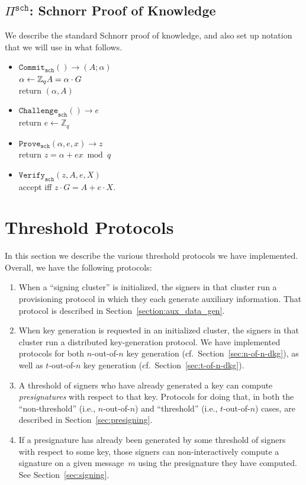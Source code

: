 \documentclass[11pt]{article}
\newcommand{\proof}[1]{\ensuremath{\Pi^{\mathtt{#1}}}}
\newcommand{\commit}[1]{\ensuremath{\mathtt{Commit}_{\mathtt{#1}}}}
\newcommand{\challenge}[1]{\ensuremath{\mathtt{Challenge}_{\mathtt{#1}}}}
\newcommand{\prove}[1]{\ensuremath{\mathtt{Prove}_{\mathtt{#1}}}}
\newcommand{\verify}[1]{\ensuremath{\mathtt{Verify}_{\mathtt{#1}}}}
\newcommand{\Z}{\mathbb{Z}}
\newcommand{\?}[1]{\stackrel{?}{#1}}
\begin{document}
\subsection{\proof{sch}: Schnorr Proof of Knowledge}
We describe the standard Schnorr proof of knowledge, and also set up notation that we will use in what follows.
\begin{itemize}
    \item $\commit{sch}() \to (A; \alpha)$ \\
    $\alpha \gets \Z_q \\
    A = \alpha \cdot G$ \\
    return $(\alpha, A)$

    \item $\challenge{sch}() \to e$ \\
    return $e \gets \Z_q$

    \item $\prove{sch}(\alpha, e, x) \to z$ \\
    return $z = \alpha + e x \bmod q$

    \item $\verify{sch}(z, A, e, X)$ \\
    accept iff $z \cdot G = A + e \cdot X$.
\end{itemize}


\section{Threshold Protocols}

In this section we describe the various threshold protocols we have implemented. 
Overall, we have the following protocols:
\begin{enumerate}
    \item When a ``signing cluster'' is initialized, the signers in that cluster run a provisioning protocol in which they each generate auxiliary information. That protocol is described in Section~\ref{section:aux_data_gen}. 

    \item When key generation is requested in an initialized cluster, the signers in that cluster run a distributed key-generation protocol. 
    We have implemented protocols for both $n$-out-of-$n$ key generation (cf.\ Section~\ref{sec:n-of-n-dkg}), as well as $t$-out-of-$n$ key  generation (cf.\ Section~\ref{sec:t-of-n-dkg}).

    \item A threshold of signers who have already generated a key can compute \emph{presignatures} with respect to that key. Protocols for doing that, in both the ``non-threshold'' (i.e., $n$-out-of-$n$) and ``threshold'' (i.e., $t$-out-of-$n$) cases, are described in Section~\ref{sec:presigning}.

    \item If a presignature has already been generated by some threshold of signers with respect to some key, those signers can non-interactively compute a signature on a given message~$m$ using the presignature they have computed. See Section~\ref{sec:signing}.
\end{enumerate}
\end{document}
